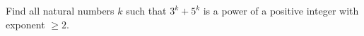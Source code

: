 Find all natural numbers $k$ such that $3^k+5^k$ is a power
of a positive integer with exponent $\geq 2$.